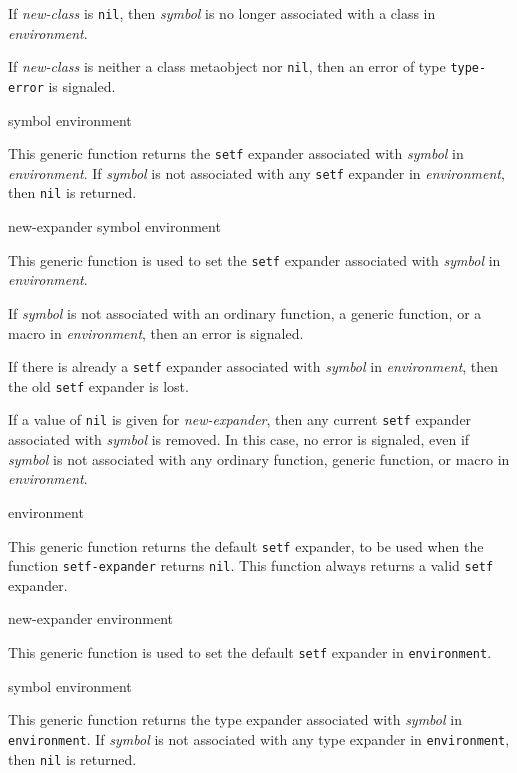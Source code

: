 If \textit{new-class} is \texttt{nil}, then \textit{symbol} is no
longer associated with a class in \textit{environment}.

If \textit{new-class} is neither a class metaobject nor \texttt{nil},
then an error of type \texttt{type-error} is signaled.

 {symbol environment}

This generic function returns the \texttt{setf} expander associated
with \textit{symbol} in \textit{environment}.  If \textit{symbol} is
not associated with any \texttt{setf} expander in
\textit{environment}, then \texttt{nil} is returned.

 {new-expander symbol environment}

This generic function is used to set the \texttt{setf} expander
associated with \textit{symbol} in \textit{environment}.

If \textit{symbol} is not associated with an ordinary function, a
generic function, or a macro in \textit{environment}, then an error is
signaled.

If there is already a \texttt{setf} expander associated with
\textit{symbol} in \textit{environment}, then the old \texttt{setf}
expander is lost.

If a value of \texttt{nil} is given for \textit{new-expander}, then
any current \texttt{setf} expander associated with \textit{symbol} is
removed.  In this case, no error is signaled, even if \textit{symbol}
is not associated with any ordinary function, generic function, or
macro in \textit{environment}.

 {environment}

This generic function returns the default \texttt{setf} expander, to
be used when the function \texttt{setf-expander} returns \texttt{nil}.
This function always returns a valid \texttt{setf} expander.

 {new-expander environment}

This generic function is used to set the default \texttt{setf}
expander in \texttt{environment}.

 {symbol environment}

This generic function returns the type expander associated with
\textit{symbol} in \texttt{environment}.  If \textit{symbol} is not
associated with any type expander in \texttt{environment}, then
\texttt{nil} is returned.

